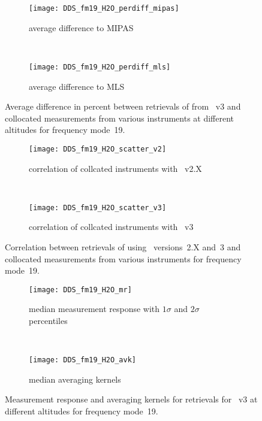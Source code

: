 \begin{figure}[tbhp]
    \centering
    \begin{subfigure}[b]{0.49\textwidth}
        \texttt{[image: DDS\_fm19\_H2O\_perdiff\_mipas]}
        \caption{average difference to MIPAS}
        \label{fig:fm19:H2O:profiles:MIPAS}
    \end{subfigure}
    \,
    \begin{subfigure}[b]{0.49\textwidth}
        \texttt{[image: DDS\_fm19\_H2O\_perdiff\_mls]}
        \caption{average difference to MLS}
        \label{fig:fm19:H2O:profiles:MLS}
    \end{subfigure}
    \caption{Average difference in percent between retrievals of 
    from \smr~v3 and collocated measurements from various instruments at
    different altitudes for frequency mode~19.}

    \label{fig:fm19:H2O:profiles}
\end{figure}

\begin{figure}[tbhp]
    \centering
    \begin{subfigure}[b]{0.49\textwidth}
        \texttt{[image: DDS\_fm19\_H2O\_scatter\_v2]}
        \caption{correlation of collcated instruments with \smr~v2.X}
        \label{fig:fm19:H2O:scatter:v2}
    \end{subfigure}
    \,
    \begin{subfigure}[b]{0.49\textwidth}
        \texttt{[image: DDS\_fm19\_H2O\_scatter\_v3]}
        \caption{correlation of collcated instruments with \smr~v3}
        \label{fig:fm19:H2O:scatter:v3}
    \end{subfigure}
    \caption{Correlation between retrievals of  using \smr\
    versions~2.X and~3 and collocated measurements from various instruments
    for frequency mode~19.}
    \label{fig:fm19:H2O:scatter}
\end{figure}

\begin{figure}[tbhp]
    \centering
    \begin{subfigure}[b]{0.49\textwidth}
        \texttt{[image: DDS\_fm19\_H2O\_mr]}
        \caption{median measurement response with $1\sigma$ and $2\sigma$
        percentiles}
        \label{fig:fm19:H2O:mr}
    \end{subfigure}
    \,
    \begin{subfigure}[b]{0.49\textwidth}
        \texttt{[image: DDS\_fm19\_H2O\_avk]}
        \caption{median averaging kernels\newline~}
        \label{fig:fm19:H2O:avk}
    \end{subfigure}
    \caption{Measurement response and averaging kernels for 
    retrievals for \smr~v3 at different altitudes for frequency mode~19.}
    \label{fig:fm19:H2O:mr_avk}
\end{figure}


